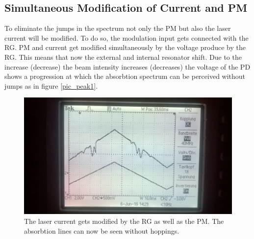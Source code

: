 \subsection{Simultaneous Modification of Current and PM}
To eliminate the jumps in the spectrum not only the PM but also the laser current will be modified. To do so, the modulation input gets connected with the 
RG. PM and current get modified simultaneously by the voltage produce by the RG. This means that now the external and internal resonator shift. Due to the 
increase (decrease) the beam intensity increases (decreases) the voltage of the PD shows a progression at which the absorbtion spectrum can be perceived
without jumps as in figure \ref{pic_peak1}.
\begin{figure}[H]
 \includegraphics[width=\textwidth]{../pics/CandPM.jpg}
 \caption{The laser current gets modified by the RG as well as the PM. The absorbtion lines can now be seen without hoppings.}
 \label{pic_CandPM}
\end{figure}

